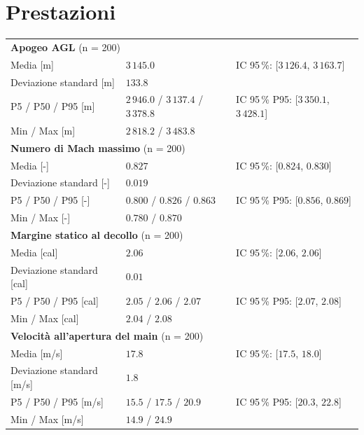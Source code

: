 \documentclass[11pt,a4paper]{article}
\begin{document}
\section{Prestazioni}
\begin{table}[H]\centering\begin{tabular}{lll}\toprule
\multicolumn{3}{l}{\textbf{Apogeo AGL} (n = 200)} \\
Media [m] & $3\,145.0$ & IC 95\,\%: [$3\,126.4$, $3\,163.7$] \\
Deviazione standard [m] & $133.8$ & \\
P5 / P50 / P95 [m] & $2\,946.0$ / $3\,137.4$ / $3\,378.8$ & IC 95\,\% P95: [$3\,350.1$, $3\,428.1$] \\
Min / Max [m] & $2\,818.2$ / $3\,483.8$ & \\
\midrule
\multicolumn{3}{l}{\textbf{Numero di Mach massimo} (n = 200)} \\
Media [-] & $0.827$ & IC 95\,\%: [$0.824$, $0.830$] \\
Deviazione standard [-] & $0.019$ & \\
P5 / P50 / P95 [-] & $0.800$ / $0.826$ / $0.863$ & IC 95\,\% P95: [$0.856$, $0.869$] \\
Min / Max [-] & $0.780$ / $0.870$ & \\
\midrule
\multicolumn{3}{l}{\textbf{Margine statico al decollo} (n = 200)} \\
Media [cal] & $2.06$ & IC 95\,\%: [$2.06$, $2.06$] \\
Deviazione standard [cal] & $0.01$ & \\
P5 / P50 / P95 [cal] & $2.05$ / $2.06$ / $2.07$ & IC 95\,\% P95: [$2.07$, $2.08$] \\
Min / Max [cal] & $2.04$ / $2.08$ & \\
\midrule
\multicolumn{3}{l}{\textbf{Velocità all'apertura del main} (n = 200)} \\
Media [m/s] & $17.8$ & IC 95\,\%: [$17.5$, $18.0$] \\
Deviazione standard [m/s] & $1.8$ & \\
P5 / P50 / P95 [m/s] & $15.5$ / $17.5$ / $20.9$ & IC 95\,\% P95: [$20.3$, $22.8$] \\
Min / Max [m/s] & $14.9$ / $24.9$ & \\
\bottomrule\end{tabular}\end{table}
\end{document}

